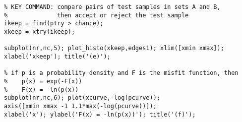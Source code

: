 \documentclass[11pt,titlepage,fleqn]{article}
\begin{document}
\begin{spacing}{1.0}
\begin{verbatim}
% KEY COMMAND: compare pairs of test samples in sets A and B,
%              then accept or reject the test sample
ikeep = find(ptry > chance);
xkeep = xtry(ikeep);

subplot(nr,nc,5); plot_histo(xkeep,edges1); xlim([xmin xmax]);
xlabel('xkeep'); title('(e)');

% if p is a probability density and F is the misfit function, then
%    p(x) = exp(-F(x))
%    F(x) = -ln(p(x))
subplot(nr,nc,6); plot(xcurve,-log(pcurve));
axis([xmin xmax -1 1.1*max(-log(pcurve))]);
xlabel('x'); ylabel('F(x) = -ln(p(x))'); title('(f)');
\end{verbatim}
\end{spacing}

\end{document}
